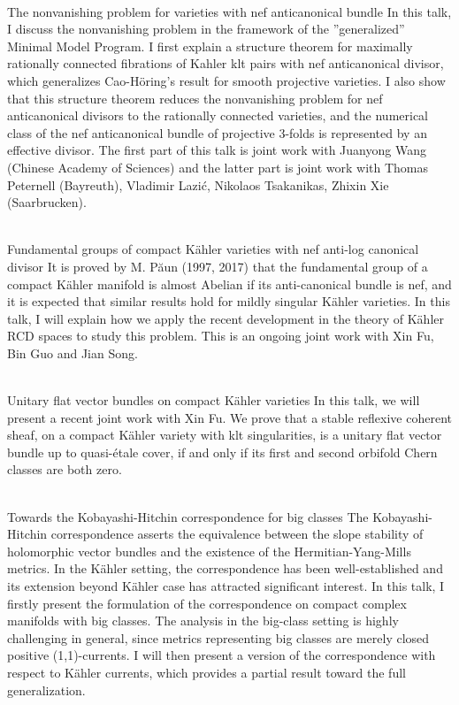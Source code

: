 \documentclass[dvipdfmx,a4paper,12pt]{article}
\theoremstyle{plain} %
\theoremstyle{definition} %
\begin{document}
\vskip5mm
\\
The nonvanishing problem for varieties with nef anticanonical bundle
\vskip3mm
In this talk, I discuss the nonvanishing problem in the framework of the ''generalized'' Minimal Model Program.
I first explain a structure theorem for maximally rationally connected fibrations of Kahler klt pairs with nef anticanonical divisor,
which generalizes Cao-H\"oring's result for smooth projective varieties.
I also show that this structure theorem reduces the nonvanishing problem for nef anticanonical divisors to the rationally connected varieties, and the numerical class of the nef anticanonical bundle of projective 3-folds is represented by an effective divisor.
The first part of this talk is joint work with Juanyong Wang (Chinese Academy of Sciences) and
the latter part is joint work with Thomas Peternell (Bayreuth), Vladimir Lazi\'c, Nikolaos Tsakanikas, Zhixin Xie (Saarbrucken).
\vskip8mm

\newpage 
{}\\
Fundamental groups of compact Kähler varieties with nef anti-log canonical divisor
\vskip3mm
It is proved by M. Păun (1997, 2017) that the fundamental group of a compact Kähler manifold is almost Abelian if its anti-canonical bundle is nef, and it is expected that similar results hold for mildly singular Kähler varieties. In this talk, I will explain how we apply the recent development in the theory of Kähler RCD spaces to study this problem. This is an ongoing joint work with Xin Fu, Bin Guo and Jian Song. 
\vskip8mm

\\
Unitary flat vector bundles on compact K\"ahler varieties 
\vskip3mm
In this talk, we will present a recent joint work with Xin Fu. We prove that a stable reflexive coherent sheaf, on a compact K\"ahler variety with klt singularities, is a unitary flat vector bundle up to quasi-\'etale cover, if and only if its first and second orbifold Chern classes are both zero. 
\vskip8mm

\\
Towards the Kobayashi-Hitchin correspondence for big classes
\vskip3mm
The Kobayashi-Hitchin correspondence asserts the equivalence between the slope stability of holomorphic vector bundles and the existence of the Hermitian-Yang-Mills metrics. In the Kähler setting, the correspondence has been well-established and its extension beyond Kähler case has attracted significant interest. In this talk, I firstly present the formulation of the correspondence on compact complex manifolds with big classes. The analysis in the big-class setting is highly challenging in general, since metrics representing big classes are merely closed positive (1,1)-currents. I will then present a version of the correspondence with respect to Kähler currents, which provides a partial result toward the full generalization.
\vskip6mm
\end{document}
